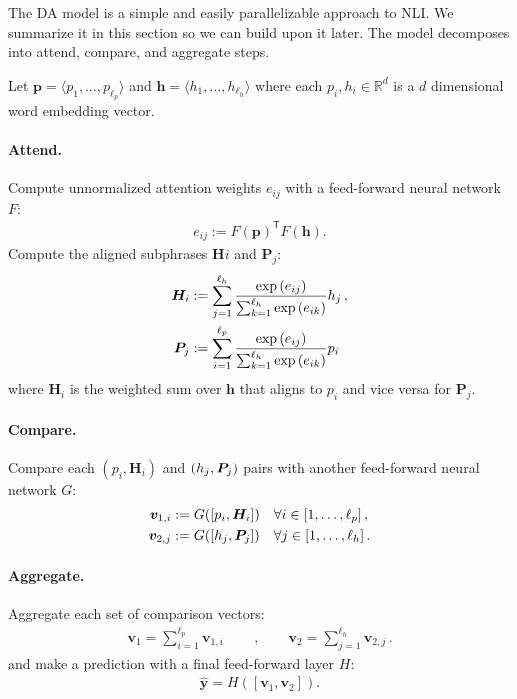 \documentclass[11pt,a4paper]{article}
\begin{document}
The DA model is a simple and easily parallelizable approach to NLI.
We summarize it in this section so we can build upon it later.
The model
decomposes into attend, compare, and aggregate steps.

Let
$\bm{p} = \langle p_1, \dots, p_{\ell_p} \rangle$ and
$\bm{h} = \langle h_1, \dots, h_{\ell_h} \rangle$ where each $p_i, h_i \in \mathbb{R}^d$
is a $d$ dimensional word embedding vector.

\paragraph{Attend.} Compute unnormalized attention weights $e_{ij}$ with
a feed-forward neural network $F$:
\begin{align}
    e_{ij} := F(\bm{p})^\mathsf{T} F(\bm{h}).
\end{align}
Compute the aligned subphrases $\bm{H}i$ and $\bm{P}_j$:
\begin{align}
    \bm{H}_i &:= \sum_{j=1}^{\ell_h}\frac{\exp{(e_{ij})}}
                                        {\sum_{k=1}^{\ell_h}\exp{(e_{ik})}}h_j\,, \notag \\
    \bm{P}_j &:= \sum_{i=1}^{\ell_p}\frac{\exp{(e_{ij})}}
                                        {\sum_{k=1}^{\ell_h}\exp{(e_{ik})}}p_i\
\end{align}
where $\bm{H}_i$ is the weighted sum over $\bm{h}$ that aligns to $p_i$ and vice versa
for $\bm{P}_j$.

\paragraph{Compare.} Compare each $(p_i, \bm{H}_i)$ and $(h_j, \bm{P_}j)$ pairs
with another feed-forward neural network $G$:
\begin{align}
    \bm{v}_{1,i} &:= G([p_i, \bm{H}_i])\quad \forall i \in [1,\ldots, \ell_p]\,, \notag \\
    \bm{v}_{2,j} &:= G([h_j, \bm{P}_j])\quad \forall j \in [1,\ldots, \ell_h]\,.
\end{align}

\paragraph{Aggregate.} Aggregate each set of comparison vectors:
\begin{align}
\bm{v}_{1} = \sum_{i=1}^{\ell_p} \bm{v}_{1,i} \qquad\,, \qquad
\bm{v}_{2} = \sum_{j=1}^{\ell_h}  \bm{v}_{2,j}\,.
\end{align}
and make a prediction with a final feed-forward layer $H$:
\begin{align}
    \hat{\bm{y}} = H([\bm{v}_1, \bm{v}_2]).
\end{align}
\end{document}
